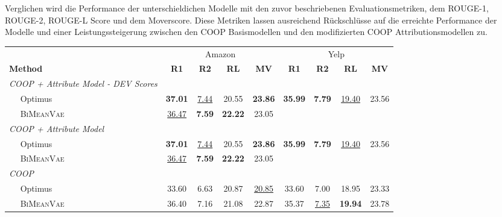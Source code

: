 Verglichen wird die Performance der unterschieldichen Modelle mit den zuvor beschriebenen Evaluationsmetriken, dem ROUGE-1, ROUGE-2, ROUGE-L Score und dem Moverscore.
Diese Metriken lassen ausreichend Rückschlüsse auf die erreichte Performance der Modelle und einer Leistungssteigerung zwischen den COOP Basismodellen und den modifizierten COOP Attributionsmodellen zu.

\begin{table}[!h]
    \label{eval_results}
    \centering
    \begin{tabular}{@{}lcccccccc@{}}
    \toprule
                               & \multicolumn{4}{c}{Amazon} & \multicolumn{4}{c}{Yelp} \\ 
    \textbf{Method} & \textbf{R1} & \textbf{R2} & \textbf{RL} & \textbf{MV} & \textbf{R1} & \textbf{R2} & \textbf{RL} & \textbf{MV}\\ \midrule
    \textit{COOP + Attribute Model - DEV Scores}        &         &         &        &        &        &   & &     \\
    $\quad$ Optimus            &     \textbf{37.01}    &   \underline{7.44}  &  20.55  & \textbf{23.86} &   \textbf{35.99}   &   \textbf{7.79}       & \underline{19.40}   &   23.56 \\ 
    $\quad$ \textsc{BiMeanVae}   &   \underline{36.47}   &   \textbf{7.59}    &   \textbf{22.22}  & 23.05 &     &      &   &    \\ \midrule
    
    \textit{COOP + Attribute Model}        &         &         &        &        &        &   & &     \\
    $\quad$ Optimus            &     \textbf{37.01}    &   \underline{7.44}  &  20.55  & \textbf{23.86} &   \textbf{35.99}   &   \textbf{7.79}       & \underline{19.40}   &   23.56 \\ 
    $\quad$ \textsc{BiMeanVae}   &   \underline{36.47}   &   \textbf{7.59}    &   \textbf{22.22}  & 23.05 &     &      &   &    \\ \midrule
    

    \textit{COOP}              &         &         &        &        &        & &   &    \\
    $\quad$ Optimus           & 33.60  & 6.63    & 20.87 & \underline{20.85} & 33.60  & 7.00   & 18.95 & 23.33\\ 
    $\quad$ \textsc{BiMeanVae}  & 36.40 &  7.16 &  21.08 & 22.87 & 35.37  & \underline{7.35}  & \textbf{19.94} & 23.78\\ \midrule
    

\end{tabular}
\end{table}
